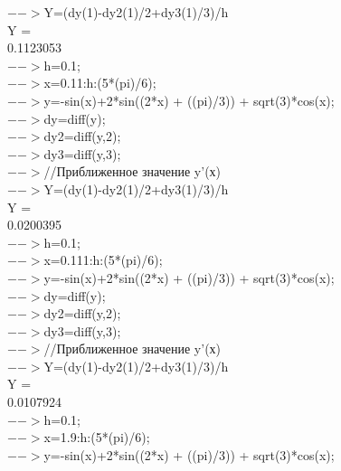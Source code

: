 \documentclass[russian,utf8,nocolumnxxxi,nocolumnxxxii]{eskdtext}
\begin{document}
  $-->$Y=(dy(1)-dy2(1)/2+dy3(1)/3)/h\\
 Y  =\\

    0.1123053  \\

  $-->$h=0.1;\\

  $-->$x=0.11:h:(5*(pi)/6);\\

  $-->$y=-sin(x)+2*sin((2*x) + ((pi)/3)) + sqrt(3)*cos(x);\\

  $-->$dy=diff(y);\\

  $-->$dy2=diff(y,2);\\

  $-->$dy3=diff(y,3);\\

  $-->$//Приближенное значение y’(х)\\

  $-->$Y=(dy(1)-dy2(1)/2+dy3(1)/3)/h\\
 Y  =\\

    0.0200395  \\

  $-->$h=0.1;\\

  $-->$x=0.111:h:(5*(pi)/6);\\

  $-->$y=-sin(x)+2*sin((2*x) + ((pi)/3)) + sqrt(3)*cos(x);\\

  $-->$dy=diff(y);\\

  $-->$dy2=diff(y,2);\\

  $-->$dy3=diff(y,3);\\

  $-->$//Приближенное значение y’(х)\\

  $-->$Y=(dy(1)-dy2(1)/2+dy3(1)/3)/h\\
 Y  =\\

    0.0107924  \\

  $-->$h=0.1;\\

  $-->$x=1.9:h:(5*(pi)/6);\\

  $-->$y=-sin(x)+2*sin((2*x) + ((pi)/3)) + sqrt(3)*cos(x);\\
\end{document}
